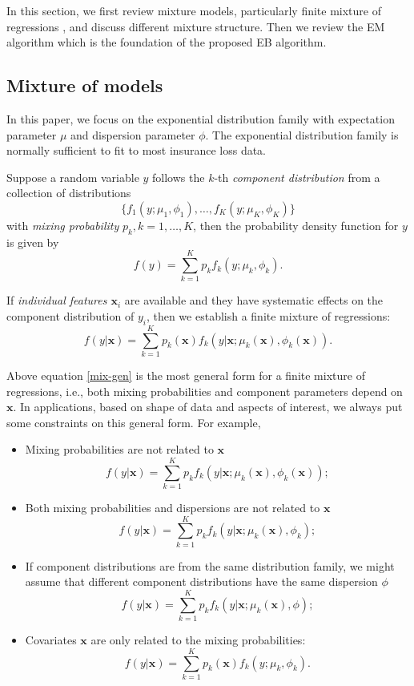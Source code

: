 \documentclass[11pt]{article}
\numberwithin{equation}{section}
\def\bx{\boldsymbol{x}}
\begin{document}
In this section, we first review mixture models, particularly finite mixture of regressions \citep{peel2000finite}, and discuss different mixture structure. 
Then we review the EM algorithm which is the foundation of the proposed EB algorithm. 


\subsection{Mixture of models}\label{review:mix1}
In this paper, we focus on the exponential distribution family with expectation parameter $\mu$ and dispersion parameter $\phi$. 
The exponential distribution family is normally sufficient to fit to most insurance loss data.

	Suppose a random variable $y$ follows the $k$-th {\it component distribution} from a collection of distributions
	$$\{f_1(y;\mu_1,\phi_1),\ldots,f_K(y;\mu_K,\phi_K)\}$$
	with \textit{mixing probability} $p_k, k=1,\ldots,K$,
	then the probability density function for $y$ is given by 
	$$f(y)=\sum_{k=1}^Kp_kf_k(y;\mu_k,\phi_k).$$

	If {\it individual features $\bx_i$} are available and they have systematic effects on the component distribution of $y_i$, then we establish a finite mixture of regressions:
	\begin{equation}\label{mix-gen}
		f(y|\bx)=\sum_{k=1}^Kp_k(\bx)f_k(y|\bx;\mu_k(\bx),\phi_k(\bx)).
	\end{equation}
	
	
	Above equation \eqref{mix-gen} is the most general form for a finite mixture of regressions, 
	i.e., both mixing probabilities and component parameters depend on $\bx$.
	 In applications,  based on  shape of data and  aspects of interest, we always put some constraints on this general form. For example,
	\begin{itemize}
		\item Mixing probabilities are not related to $\bx$
		$$f(y|\bx)=\sum_{k=1}^Kp_kf_k(y|\bx;\mu_k(\bx),\phi_k(\bx));$$
		\item Both mixing probabilities and dispersions are not related to $\bx$
		$$f(y|\bx)=\sum_{k=1}^Kp_kf_k(y|\bx;\mu_k(\bx),\phi_k);$$

		\item If component distributions are from the same distribution family, we might assume that different component distributions have the same dispersion $\phi$
		$$f(y|\bx)=\sum_{k=1}^Kp_kf_k(y|\bx;\mu_k(\bx),\phi);$$
		\item Covariates $\bx$ are only related to the mixing probabilities:
		$$f(y|\bx)=\sum_{k=1}^Kp_k(\bx)f_k(y;\mu_k,\phi_k).$$
	\end{itemize}
	
\end{document}

